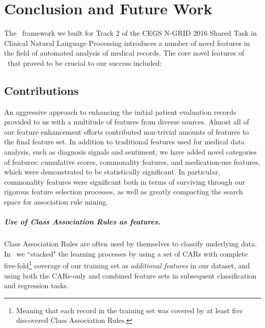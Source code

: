 \chapter{Conclusion and Future Work}\label{sec:conclusion}

The \CREATE\ framework we built for Track 2 of the CEGS N-GRID 2016 Shared Task in Clinical Natural Language Processing introduces a number of novel features in the
field of automated analysis of medical records. The core novel
features of \CREATE\ that proved to be crucial to our success included:

\section{Contributions}

 An aggressive approach to enhancing the
initial patient evaluation records provided to us with a multitude of features
from diverse sources. Almost all of our feature enhancement efforts 
contributed non-trivial amounts of features to the final feature set. In addition
to traditional features used for medical data analysis, such as diagnosis signals and sentiment, we have added novel categories of features: cumulative scores, commonality
features, and medication-use features, which were demonstrated to be statistically significant. In particular, commonality features were significant both in terms of surviving through our rigorous feature selection processes, as well as greatly compacting the search space for association rule mining. 

\paragraph{Use of Class Association Rules as features.} Class Association Rules
are often used by themselves to classify underlying data. In \CREATE\ we ``stacked"
the learning processes by using a set of CARs with complete five-fold\footnote{Meaning
that each record in the training set was covered by at least five discovered
Class Association Rules.} coverage of our training set as \textit{additional features} 
in our dataset, and using both the CARs-only and combined feature sets in
subsequent classification and regression tasks.

